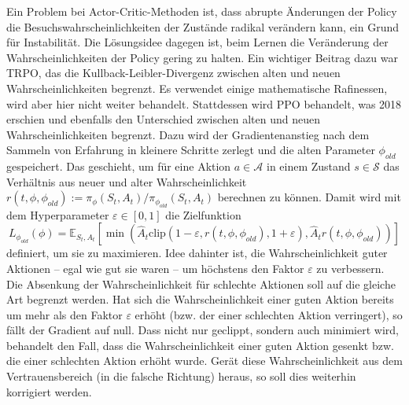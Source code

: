 Ein Problem bei Actor-Critic-Methoden ist, dass abrupte Änderungen der Policy die Besuchswahrscheinlichkeiten der Zustände radikal verändern kann, ein Grund für Instabilität.
Die Lösungsidee dagegen ist, beim Lernen die Veränderung der Wahrscheinlichkeiten der Policy gering zu halten.
Ein wichtiger Beitrag dazu war TRPO, das die Kullback-Leibler-Divergenz zwischen alten und neuen Wahrscheinlichkeiten begrenzt. \cite{trpo2015}
Es verwendet einige mathematische Rafinessen, wird aber hier nicht weiter behandelt.
Stattdessen wird PPO behandelt, was 2018 erschien und ebenfalls den Unterschied zwischen alten und neuen Wahrscheinlichkeiten begrenzt. \cite{ppo2018}
Dazu wird der Gradientenanstieg nach dem Sammeln von Erfahrung in kleinere Schritte zerlegt und die alten Parameter $\phi_{old}$ gespeichert.
Das geschieht, um für eine Aktion $a \in \mathcal{A}$ in einem Zustand $s \in \mathcal{S}$ das Verhältnis aus neuer und alter Wahrscheinlichkeit $r(t, \phi, \phi_{old}) := \pi_\phi(S_t, A_t) / \pi_{\phi_{old}}(S_t, A_t)$ berechnen zu können.
Damit wird mit dem Hyperparameter $\varepsilon \in [0, 1]$ die Zielfunktion
\begin{equation}
	L_{\phi_{old}}(\phi) = \mathbb{E}_{S_t, A_t}\left[\min{\left(\hat{A}_t \text{clip}{\left(1 - \varepsilon, r(t, \phi, \phi_{old}), 1 + \varepsilon\right)}, \hat{A}_t r(t, \phi, \phi_{old})\right)}\right]
\end{equation}
definiert, um sie zu maximieren.
Idee dahinter ist, die Wahrscheinlichkeit guter Aktionen -- egal wie gut sie waren -- um höchstens den Faktor $\varepsilon$ zu verbessern.
Die Absenkung der Wahrscheinlichkeit für schlechte Aktionen soll auf die gleiche Art begrenzt werden.
Hat sich die Wahrscheinlichkeit einer guten Aktion bereits um mehr als den Faktor $\varepsilon$ erhöht (bzw. der einer schlechten Aktion verringert), so fällt der Gradient auf null.
Dass nicht nur geclippt, sondern auch minimiert wird, behandelt den Fall, dass die Wahrscheinlichkeit einer guten Aktion gesenkt bzw. die einer schlechten Aktion erhöht wurde.
Gerät diese Wahrscheinlichkeit aus dem Vertrauensbereich (in die falsche Richtung) heraus, so soll dies weiterhin korrigiert werden.

